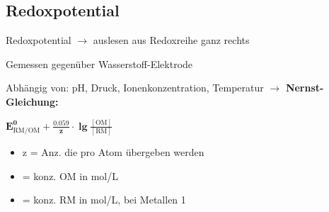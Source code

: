 \subsection{Redoxpotential}
    Redoxpotential $\to$ auslesen aus Redoxreihe ganz rechts 
    
    Gemessen gegenüber Wasserstoff-Elektrode

    Abhängig von: pH, Druck, Ionenkonzentration, Temperatur $\to$ \textbf{Nernst-Gleichung:}

    


    \begin{minipage}{0.4\linewidth}
        \(
        \boxed{\bm{E^{0}_{\mathrm{RM/OM}} + \frac{0.059}{z} \cdot \lg \frac{[\mathrm{OM}]}{[\mathrm{RM}]}}}
        \)
    \end{minipage}
    \hfill
    \begin{minipage}{0.55\linewidth}
        \begin{itemize}
            \item z = Anz.  die pro Atom übergeben werden
            \item \ce{[OM]} = konz. OM in mol/L
            \item \ce{[RM]} = konz. RM in mol/L, bei Metallen 1
        \end{itemize}
    \end{minipage}


